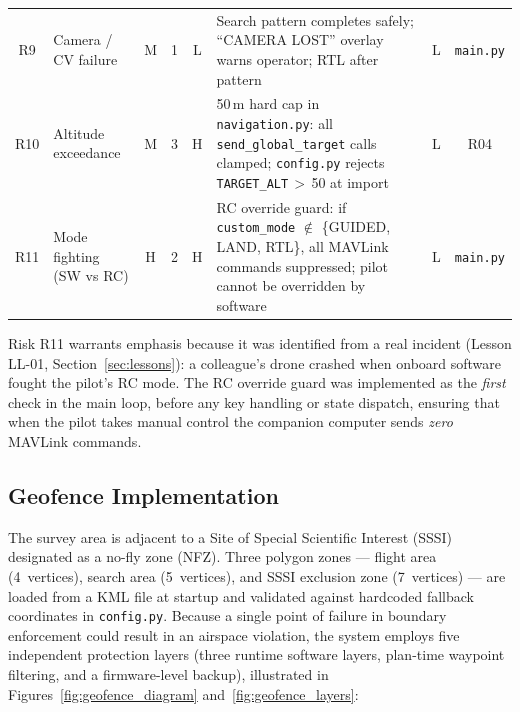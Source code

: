 \begin{table}[htbp]
\begin{tabular}{clcccp{4.8cm}cc}
R9 & Camera / CV failure & M & 1 & \cellcolor{green!20}L & Search pattern completes safely; ``CAMERA LOST'' overlay warns operator; RTL after pattern & \cellcolor{green!20}L & \texttt{main.py} \\
R10 & Altitude exceedance & M & 3 & \cellcolor{red!25}H & 50\,m hard cap in \texttt{navigation.py}: all \texttt{send\_global\_target} calls clamped; \texttt{config.py} rejects \texttt{TARGET\_ALT}\,$>$\,50 at import & \cellcolor{green!20}L & R04 \\
R11 & Mode fighting (SW vs RC) & H & 2 & \cellcolor{red!25}H & RC override guard: if \texttt{custom\_mode} $\notin$ \{GUIDED, LAND, RTL\}, all MAVLink commands suppressed; pilot cannot be overridden by software & \cellcolor{green!20}L & \texttt{main.py} \\
\bottomrule
\end{tabular}
\end{table}

Risk R11 warrants emphasis because it was identified from a real incident (Lesson LL-01, Section~\ref{sec:lessons}): a colleague's drone crashed when onboard software fought the pilot's RC mode. The RC override guard was implemented as the \emph{first} check in the main loop, before any key handling or state dispatch, ensuring that when the pilot takes manual control the companion computer sends \emph{zero} MAVLink commands.

\subsection{Geofence Implementation}\label{sec:geofencing}

The survey area is adjacent to a Site of Special Scientific Interest (SSSI) designated as a no-fly zone (NFZ). Three polygon zones --- flight area (4~vertices), search area (5~vertices), and SSSI exclusion zone (7~vertices) --- are loaded from a KML file at startup and validated against hardcoded fallback coordinates in \texttt{config.py}. Because a single point of failure in boundary enforcement could result in an airspace violation, the system employs five independent protection layers (three runtime software layers, plan-time waypoint filtering, and a firmware-level backup), illustrated in Figures~\ref{fig:geofence_diagram} and~\ref{fig:geofence_layers}:

